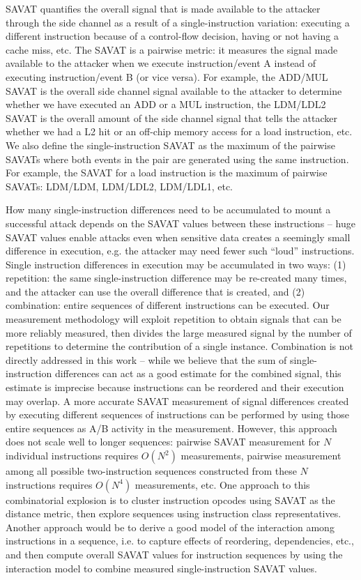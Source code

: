 SAVAT quantifies the overall signal that is made available to the attacker through the side channel as a result of a single-instruction variation: executing a different instruction because of a control-flow decision, having or not having a cache miss, etc. The SAVAT is a pairwise metric: it measures the signal made available to the attacker when we execute instruction/event A instead of executing instruction/event B (or vice versa). For example, the ADD/MUL SAVAT is the overall side channel signal available to the attacker to determine whether we have executed an ADD or a MUL instruction, the LDM/LDL2 SAVAT is the overall amount of the side channel signal that tells the attacker whether we had a L2 hit or an off-chip memory access for a load instruction, etc. We also define the single-instruction SAVAT as the maximum of the pairwise SAVATs where both events in the pair are generated using the same instruction. For example, the SAVAT for a load instruction is the maximum of pairwise SAVATs: LDM/LDM, LDM/LDL2, LDM/LDL1, etc.

How many single-instruction differences need to be accumulated to mount a successful attack depends on the SAVAT values between these instructions -- huge SAVAT values enable attacks even when sensitive data creates a seemingly small difference in execution, e.g. the attacker may need fewer such ``loud'' instructions. Single instruction differences in execution may be accumulated in two ways: (1) repetition: the same single-instruction difference may be re-created many times, and the attacker can use the overall difference that is created, and (2) combination: entire sequences of different instructions can be executed. Our measurement methodology will exploit repetition to obtain signals that can be more reliably measured, then divides the large measured signal by the number of repetitions to determine the contribution of a single instance. Combination is not directly addressed in this work -- while we believe that the sum of single-instruction differences can act as a good estimate for the combined signal, this estimate is imprecise because instructions can be reordered and their execution may overlap. A more accurate SAVAT measurement of signal differences created by executing different sequences of instructions can be performed by using those entire sequences as A/B activity in the measurement. However, this approach does not scale well to longer sequences: pairwise SAVAT measurement for $N$ individual instructions requires $O(N^2)$ measurements, pairwise measurement among all possible two-instruction sequences constructed from these $N$ instructions requires $O(N^4)$ measurements, etc. One approach to this combinatorial explosion is to cluster instruction opcodes using SAVAT as the distance metric, then explore sequences using instruction class representatives. Another approach would be to derive a good model of the interaction among instructions in a sequence, i.e. to capture effects of reordering, dependencies, etc., and then compute overall SAVAT values for instruction sequences by using the interaction model to combine measured single-instruction SAVAT values. 
